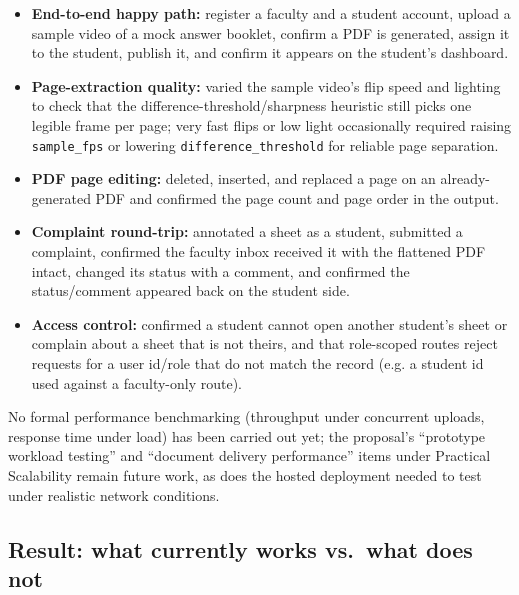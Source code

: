 \documentclass[11pt,a4paper]{article}
\begin{document}
\begin{itemize}[leftmargin=0.7cm]
  \item \textbf{End-to-end happy path:} register a faculty and a student
    account, upload a sample video of a mock answer booklet, confirm a PDF is
    generated, assign it to the student, publish it, and confirm it appears
    on the student's dashboard.
  \item \textbf{Page-extraction quality:} varied the sample video's flip
    speed and lighting to check that the difference-threshold/sharpness
    heuristic still picks one legible frame per page; very fast flips or low
    light occasionally required raising \texttt{sample\_fps} or lowering
    \texttt{difference\_threshold} for reliable page separation.
  \item \textbf{PDF page editing:} deleted, inserted, and replaced a page on
    an already-generated PDF and confirmed the page count and page order in
    the output.
  \item \textbf{Complaint round-trip:} annotated a sheet as a student,
    submitted a complaint, confirmed the faculty inbox received it with the
    flattened PDF intact, changed its status with a comment, and confirmed
    the status/comment appeared back on the student side.
  \item \textbf{Access control:} confirmed a student cannot open another
    student's sheet or complain about a sheet that is not theirs, and that
    role-scoped routes reject requests for a user id/role that do not match
    the record (e.g. a student id used against a faculty-only route).
\end{itemize}

No formal performance benchmarking (throughput under concurrent uploads,
response time under load) has been carried out yet; the proposal's
``prototype workload testing'' and ``document delivery performance'' items
under Practical Scalability remain future work, as does the hosted
deployment needed to test under realistic network conditions.

\subsection{Result: what currently works vs.\ what does not}
\end{document}
